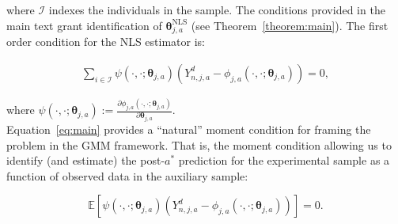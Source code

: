 \noindent where $\mathcal{I}$ indexes the individuals in the sample. The conditions provided in the main text grant identification of  $\bm{\theta}_{j,a}^{\text{NLS}}$ (see Theorem~\ref{theorem:main}). The first order condition for the NLS estimator is: 

\begin{eqnarray} 
\sum \limits _{i \in \mathcal{I}}  \psi \left( \cdot , \cdot; \bm{\theta}_{j,a} \right) \left( Y^d_{n,j,a}  - \phi_{j,a} (\cdot , \cdot; \bm{\theta}_{j,a} )\right) = 0, \label{eq:nlsfoc}
\end{eqnarray}

\noindent where $\psi \left( \cdot , \cdot; \bm{\theta}_{j,a} \right) := \frac{\partial \phi_{j,a} \left( \cdot , \cdot; \bm{\theta}_{j,a} \right)}{\partial \bm{\theta}_{j,a}}$.\\

\noindent Equation~\eqref{eq:main} provides a ``natural'' moment condition for framing the problem in the GMM framework. That is, the moment condition allowing us to identify (and estimate) the post-$a^*$ prediction for the experimental sample as a function of observed data in the auxiliary sample: 

\begin{equation}
\mathbb{E} \left[\psi \left( \cdot , \cdot; \bm{\theta}_{j,a} \right) \left( Y^d_{n,j,a}  - \phi_{j,a} (\cdot , \cdot; \bm{\theta}_{j,a} )\right) \right]  = 0.
\end{equation}



\pagebreak
\singlespace






